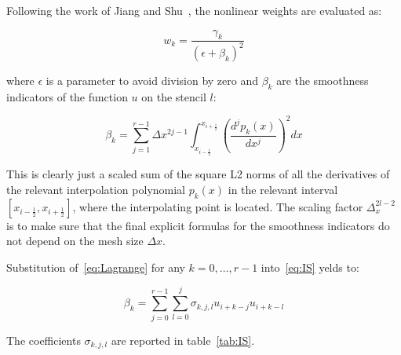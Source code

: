 Following the work of Jiang and Shu~\cite{jiang-1996}, the nonlinear weights are evaluated as:

\begin{equation}
  \label{eq:nonlinear_weights}
  w_k = \frac{\gamma_k}{\left( \epsilon + \beta_k \right)^2}
\end{equation}

where $\epsilon$ is a parameter to avoid division by zero and $\beta_k$ are the smoothness indicators of the function $u$ on the stencil $l$:

\begin{equation}
  \label{eq:IS}
  \beta_k = \sum_{j=1}^{r-1} \Delta x^{2j-1} \int_{x_{i-\frac{1}{2}}}^{x_{i+\frac{1}{2}}} \left( \frac{d^j p_k(x)}{dx^j} \right)^2 dx
\end{equation}

This is clearly just a scaled sum of the square L2 norms of all the derivatives of the relevant interpolation polynomial $p_k(x)$ in the relevant interval $[x_{i−\frac{1}{2}},x_{i+\frac{1}{2}}]$, where the interpolating point is located. The scaling factor $\Delta_x^{2l-2}$ is to make sure that the final explicit formulas for the smoothness indicators do not depend on the mesh size $\Delta x$.

Substitution of~\eqref{eq:Lagrange} for any $k=0,\dots,r-1$ into~\eqref{eq:IS} yelds to:

\begin{equation}
  \label{eq:IS_u}
  \beta_k = \sum_{j=0}^{r-1} \sum_{l=0}^j \sigma_{k,j,l} u_{i+k-j} u_{i+k-l}
\end{equation}

The coefficients $\sigma_{k,j,l}$ are reported in table~\ref{tab:IS}.

